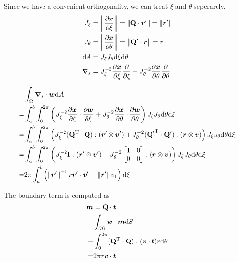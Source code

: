 \documentclass[a4paper,11pt]{article}
\renewcommand{\to}[1]{\text{\boldmath $#1$}} %
\newcommand{\ts}[1]{\text{\boldmath $\rm #1$}} %
\newcommand{\intd}[1]{{\rm d}#1}
\newcommand{\pderiv}[2]{\frac{\partial#1}{\partial#2}}
\newcommand{\norm}[1]{\left\lVert{#1}\right\rVert}
\newcommand{\T}{{\rm T}}
\begin{document}
Since we have a convenient orthogonality, we can treat $\xi$ and $\theta$ seperarely.
\begin{align}
 J_\xi &= \norm{\pderiv{\to x}{\xi}} = \norm{\ts Q \cdot \to r'} = \norm{\to r'}\\
 J_\theta &= \norm{\pderiv{\to x}{\theta}} = \norm{\ts Q' \cdot \to r} = r \\
 \intd A &= J_\xi J_\theta \intd \xi \intd \theta \\
 \to\nabla_s &= J_\xi^{-2} \pderiv{\to x}{\xi}\pderiv{}{\xi} + J_\theta^{-2} \pderiv{\to x}{\theta}\pderiv{}{\theta}
\end{align}

\begin{align}
 &\int_\Omega\to \nabla_s\cdot\to w\intd A\\
=&\int_a^b\int_0^{2\pi}\left( J_\xi^{-2} \pderiv{\to x}{\xi}\cdot\pderiv{\to w}{\xi} +
                              J_\theta^{-2} \pderiv{\to x}{\theta}\cdot\pderiv{\to w}{\theta}
  \right) J_\xi J_\theta \intd \theta \intd \xi\\
=&\int_a^b\int_0^{2\pi}\left(
	  J_\xi^{-2} (\ts Q^\T\cdot\ts Q):(\to r'\otimes \to v') +
	  J_\theta^{-2} ({\ts Q'}^\T\cdot\ts Q'):(\to r\otimes\to v)
  \right) J_\xi J_\theta \intd \theta \intd \xi\\
=&\int_a^b\int_0^{2\pi}\left(
	  J_\xi^{-2} \ts I :(\to r'\otimes \to v') +
	  J_\theta^{-2} \begin{bmatrix}1&0\\0&0\end{bmatrix}:(\to r \otimes \to v)
  \right) J_\xi J_\theta \intd \theta \intd \xi\\
=&2\pi\int_a^b\left(
	  \norm{\to r'}^{-1} r \to r' \cdot \to v' +
	  \norm{\to r'} v_1
  \right) \intd \xi
\end{align}

The boundary term is computed as
\begin{align}
 \to m &= \ts Q\cdot \to t\\
 &\int_{\partial\Omega} \to w\cdot\to m\intd S\\
=&\int_0^{2\pi} (\ts Q^\T\cdot \ts Q):(\to v\cdot\to t) r \intd \theta\\
=& 2\pi r \to v \cdot \to t
\end{align}
\end{document}
